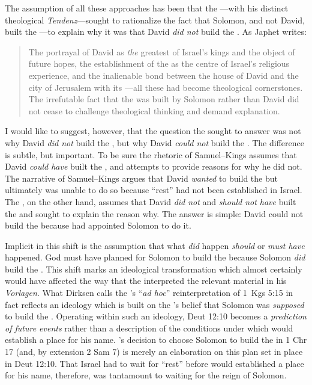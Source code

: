 The assumption of all these approaches has been that the \chronicler---with his distinct theological \emph{Tendenz}---sought to rationalize the fact that Solomon, and not David, built the \temple---to explain why it was that David \emph{did not} build the \temple. As Japhet writes:
\begin{quote}
    The portrayal of David as \emph{the} greatest of Israel's kings and the object of future hopes, the establishment of the \temple as the centre of Israel's religious experience, and the inalienable bond between the house of David and the city of Jerusalem with its \temple---all these had become theological cornerstones. The irrefutable fact that the \temple was built by Solomon rather than David did not cease to challenge theological thinking and demand explanation.\autocite[396]{japhet1993}
\end{quote}
\noindent
I would like to suggest, however, that the question the \chronicler sought to answer was not why David \emph{did not} build the \temple, but why David \emph{could not} build the \temple. The difference is subtle, but important. To be sure the rhetoric of Samuel--Kings assumes that David \emph{could have} built the \temple, and attempts to provide reasons for why he did not. The narrative of Samuel--Kings argues that David \emph{wanted} to build the \temple but ultimately  was unable to do so because ``rest'' had not been established in Israel. The \chronicler, on the other hand, assumes that David \emph{did not} and \emph{should not have} built the \temple and sought to explain the reason why. The answer is simple: David could not build the \temple because \yahweh had appointed Solomon to do it. 

Implicit in this shift is the assumption that what \emph{did} happen
\emph{should} or \emph{must have} happened. God must have planned for Solomon to build the \temple because Solomon \emph{did} build the \temple. This shift marks an ideological transformation which almost certainly would have affected the way that the \chronicler interpreted the relevant material in his \emph{Vorlagen}. What Dirksen calls the \chronicler's ``\emph{ad hoc}'' reinterpretation of 1~Kgs 5:15 in fact reflects an ideology which is built on the \chronicler's belief that Solomon was \emph{supposed} to build the \temple. Operating within such an ideology, Deut 12:10 becomes a \emph{prediction of future events} rather than a description of the conditions under which \yahweh would establish a place for his name. \yahweh's decision to choose Solomon to build the \temple in 1 Chr 17 (and, by extension 2 Sam 7) is merely an elaboration on this plan set in place in Deut 12:10. That Israel had to wait for ``rest'' before \yahweh would established a place for his name, therefore, was tantamount to waiting for the reign of Solomon. 

